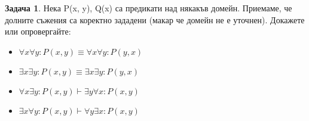 \documentclass[10pt, a4paper]{article}
\theoremstyle{definition}
\newtheorem{problem}{Задача}
\theoremstyle{remark}
\begin{document}
\hfill
\begin{problem}
    Нека P(x, y), Q(x) са предикати над някакъв домейн. Приемаме, че долните съжения са коректно зададени (макар че домейн не е уточнен). Докажете или опровергайте:
    \begin{itemize}
        \item \(\forall x\forall y: P(x, y) \equiv \forall x\forall y: P(y, x)\)
        \item \(\exists x\exists y: P(x, y) \equiv \exists x\exists y: P(y, x)\)
        \item \(\forall x\exists y: P(x, y) \vdash \exists y\forall x: P(x, y)\)
        \item \(\exists x\forall y: P(x, y) \vdash \forall y\exists x: P(x, y)\)
    \end{itemize}
\end{problem}
\end{document}

